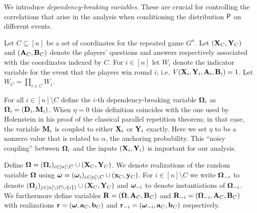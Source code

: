  
We introduce \emph{dependency-breaking variables}. These are crucial for controlling the correlations that arise in the analysis when conditioning the  distribution $\P$ on different events. 

Let $C \subseteq [n]$ be a set of coordinates for the repeated game $G^n$. 
Let $(\bX_C,\bY_C)$ and $(\bA_C,\bB_C)$ denote the players' questions and answers respectively associated with the coordinates indexed by $C$. For $i \in [n]$ let $W_i$ denote the indicator variable for the event that the players win round $i$; i.e. $V(\bX_i,\bY_i,\bA_i,\bB_i) = 1$. Let $W_C = \prod_{i \in C} W_i$. 

For all $i \in [n] \setminus C$ define the $i$-th dependency-breaking variable $\bOmega_i$ as $\bOmega_i = (\bD_i,\bM_i)$. When $\eta = 0$ this definition coincides with the one used by Holenstein in his proof of the classical parallel repetition theorem; in that case, the variable $\bM_i$ is coupled to either $\bX_i$ or $\bY_i$ exactly. Here we set $\eta$ to be a nonzero value that is related to $\alpha$, the anchoring probability. This ``noisy coupling'' between $\bOmega_i$ and the inputs $(\bX_i,\bY_i)$ is important for our analysis. 




Define $\bOmega = (\bOmega_i)_{i \in [n] \setminus C} \cup (\bX_C,\bY_C)$. We denote realizations of the random variable $\bOmega$ using $\bomega = (\bomega_i)_{i \in [n] \setminus C} \cup (\bx_C,\by_C)$. For $i \in [n] \setminus C$ we write $\bOmega_\mi$ to denote $(\bOmega_j)_{j \in [n] \setminus (C \cup \{i\})} \cup (\bX_C,\bY_C)$ and $\bomega_\mi$ to denote instantiations of $\bOmega_\mi$. We furthermore define variables $\bR = (\bOmega,\bA_C,\bB_C)$ and $\bR_\mi = (\bOmega_\mi,\bA_C,\bB_C)$ with realizations $\br = (\bomega,\ba_C,\bb_C)$ and $\br_\mi = (\bomega_\mi,\ba_C,\bb_C)$ respectively.

%
%
% 
